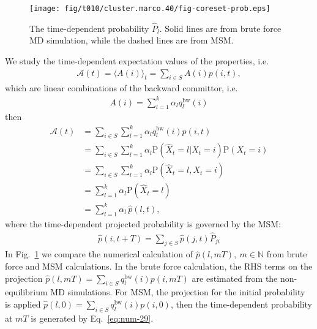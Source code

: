 \documentclass[aps, pre, preprint,unsortedaddress,a4paper,onecolumn]{revtex4}
\newcommand{\bwd}[0]{\textrm{bw}}
\newcommand{\prob}{\textrm{P}}
\begin{document}
\begin{figure}
  \centering
  \texttt{[image: fig/t010/cluster.marco.40/fig-coreset-prob.eps]}
  \caption{The time-dependent probability $\hat P_l$. Solid lines are from brute force MD simulation, while the dashed lines are from MSM.}
  \label{fig:num-7}
\end{figure}

We study the time-dependent expectation values of
the properties, i.e.
\begin{align}
  \mathcal A(t) = \langle A(i)\rangle_t = \sum_{i\in S} A(i) p(i,t),
\end{align}
which are linear combinations of the backward
committor, i.e.
\begin{align}
  A(i) = \sum_{l=1}^k \alpha_l q^\bwd_l(i)
\end{align}
then
\begin{align}\nonumber
  \mathcal A(t) &=
  \sum_{i\in S} \sum_{l=1}^k \alpha_l q^\bwd_l(i)  p(i,t) \\\nonumber
  & =
  \sum_{i\in S} \sum_{l=1}^k \alpha_l \prob (\hat X_t = l \vert X_t = i) \prob (X_t = i) \\\nonumber
  & =
  \sum_{i\in S} \sum_{l=1}^k \alpha_l \prob (\hat X_t = l ,X_t = i) \\\nonumber
  & =
  \sum_{l=1}^k \alpha_l \prob (\hat X_t = l) \\\label{eq:num-28}
  & =
   \sum_{l=1}^k \alpha_l \,\hat p (l, t),
\end{align}
where the time-dependent projected probability is governed by the MSM:
\begin{align}\label{eq:num-29}
  \hat p(i, t+T) = \sum_{j\in S} \hat p(j,t)\hat P_{ji}
\end{align}
In Fig.~\ref{fig:num-7} we compare the numerical calculation of $\hat p (l, mT), \ m\in\mathbb N$ from brute force and MSM calculations.
In the brute force calculation, the RHS terms on the projection $\hat p (l, mT) = \sum_{i\in S}  q^\bwd_l(i)  p(i,mT) $ are estimated from the
non-equilibrium MD simulations. For MSM, the projection for the initial probability is applied $\hat p (l, 0) = \sum_{i\in S}  q^\bwd_l(i)  p(i,0) $, then
the time-dependent probability at $mT$ is generated by Eq.~\eqref{eq:num-29}.



\appendix
\end{document}
